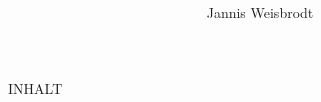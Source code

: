 \documentclass[a4paper,ngerman,10pt]{article}
\title{\textbf{\Title}}
\author{Jannis Weisbrodt}
\begin{document}
\maketitle
\thispagestyle{empty}

INHALT
\end{document}
